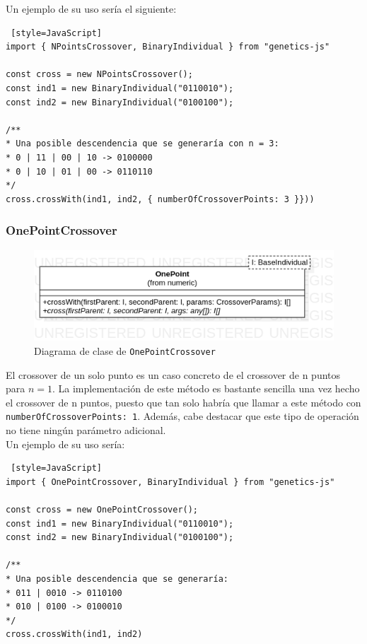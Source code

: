 Un ejemplo de su uso sería el siguiente: \\

\begin{lstlisting} [style=JavaScript]
import { NPointsCrossover, BinaryIndividual } from "genetics-js"

const cross = new NPointsCrossover();
const ind1 = new BinaryIndividual("0110010");
const ind2 = new BinaryIndividual("0100100");

/**
* Una posible descendencia que se generaría con n = 3:
* 0 | 11 | 00 | 10 -> 0100000
* 0 | 10 | 01 | 00 -> 0110110
*/
cross.crossWith(ind1, ind2, { numberOfCrossoverPoints: 3 }}))
\end{lstlisting}

\subsubsection{OnePointCrossover}

\begin{figure}[ht]
    \centering
    \includegraphics[scale=0.5]{mem/images/cap-4/4.2.6(Crossover)/OnePoint.png}
    \caption{Diagrama de clase de \texttt{OnePointCrossover}}
    \label{fig:my_label}
\end{figure}

El crossover de un solo punto \cite{de1975analysis} es un caso concreto de el crossover de n puntos para $n = 1$. La implementación de este método es bastante sencilla una vez hecho el crossover de n puntos, puesto que tan solo habría que llamar a este método con \texttt{numberOfCrossoverPoints: 1}. Además, cabe destacar que este tipo de operación no tiene ningún parámetro adicional. \\

Un ejemplo de su uso sería: \\

\begin{lstlisting} [style=JavaScript]
import { OnePointCrossover, BinaryIndividual } from "genetics-js"

const cross = new OnePointCrossover();
const ind1 = new BinaryIndividual("0110010");
const ind2 = new BinaryIndividual("0100100");

/**
* Una posible descendencia que se generaría:
* 011 | 0010 -> 0110100
* 010 | 0100 -> 0100010
*/
cross.crossWith(ind1, ind2)
\end{lstlisting}

